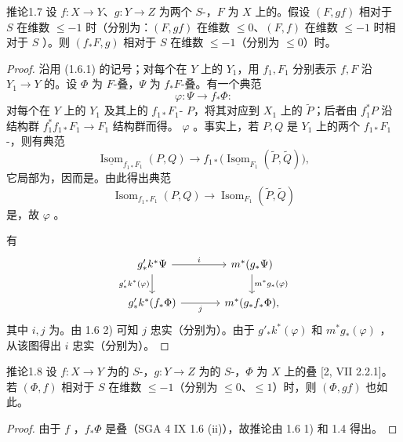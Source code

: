 \begin{SGAresult}{推论}{1.7}
设 $f:X\to Y$、$g:Y\to Z$ 为两个 $S$-，$F$ 为 $X$ 上的。假设 $(F,gf)$ 相对于 $S$ 在维数 $\leqslant-1$ 时（分别为：$(F,gf)$ 在维数 $\leqslant0$、$(F,f)$ 在维数 $\leqslant-1$ 时相对于 $S$ ）。则 $(f_*F,g)$ 相对于 $S$ 在维数 $\leqslant-1$（分别为 $\leqslant0$）时。
\end{SGAresult}
\begin{proof}
沿用 (1.6.1) 的记号；对每个在 $Y$ 上的 $Y_1$，用 $f_1,F_1$ 分别表示 $f,F$ 沿 $Y_1\to Y$ 的。设 $\Phi$ 为 $F$-叠，$\Psi$ 为 $f_*F$-叠。有一个典范
\[\varphi:\Psi\longrightarrow f_*\Phi:\]
对每个在 $Y$ 上的 $Y_1$ 及其上的 $f_{1*}F_1$- $P$，将其对应到 $X_1$ 上的 $\widetilde P$；后者由 $f_1^*P$ 沿结构群 $f_1^*f_{1*}F_1\to F_1$ 结构群而得。 $\varphi$ 。事实上，若 $P,Q$ 是 $Y_1$ 上的两个 $f_{1*}F_1$-，则有典范
\[\underline{\operatorname{Isom}}_{f_{1*}F_1}(P,Q)\longrightarrow f_{1*}\bigl(\underline{\operatorname{Isom}}_{F_1}(\widetilde P,\widetilde Q)\bigr),\]
它局部为，因而是。由此得出典范
\[\operatorname{Isom}_{f_{1*}F_1}(P,Q)\longrightarrow\operatorname{Isom}_{F_1}(\widetilde P,\widetilde Q)\]
是，故 $\varphi$ 。

有
\[
\begin{tikzcd}[column sep=large]
g'_*k^*\Psi\arrow[r,"i"]\arrow[d,"g'_*k^*(\varphi)"']&m^*(g_*\Psi)\arrow[d,"m^*g_*(\varphi)"]\\
g'_*k^*(f_*\Phi)\arrow[r,"j"']&m^*(g_*f_*\Phi),
\end{tikzcd}
\]
其中 $i,j$ 为。由 1.6 2) 可知 $j$ 忠实（分别为）。由于 $g'_*k^*(\varphi)$ 和 $m^*g_*(\varphi)$ ，从该图得出 $i$ 忠实（分别为）。
\end{proof}

\begin{SGAresult}{推论}{1.8}
设 $f:X\to Y$ 为的 $S$-，$g:Y\to Z$ 为的 $S$-，$\Phi$ 为 $X$ 上的叠 [2, VII 2.2.1]。若 $(\Phi,f)$ 相对于 $S$ 在维数 $\leqslant-1$（分别为 $\leqslant0$、$\leqslant1$）时，则 $(\Phi,gf)$ 也如此。
\end{SGAresult}
\begin{proof}
由于 $f$ ，$f_*\Phi$ 是叠（SGA 4 IX 1.6 (ii)），故推论由 1.6 1) 和 1.4 得出。
\end{proof}

